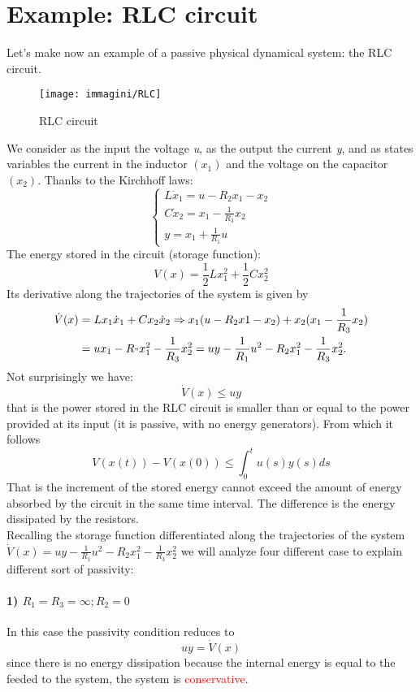 \section{Example: RLC circuit}
Let's make now an example of a passive physical dynamical system: the RLC circuit.
\begin{figure}[H]
	\centering
	\texttt{[image: immagini/RLC]}
	\caption{RLC circuit}
	\label{fig:rlc}
\end{figure}
We consider as the input the voltage \emph{u}, as the output the current \emph{y}, and as states variables the current in the inductor $(x_1)$ and the voltage on the capacitor $(x_2)$. Thanks to the Kirchhoff laws:
\[
\begin{cases}
	 L\dot{x}_1=u-R_2x_1-x_2\\
	C\dot{x}_2=x_1-\frac{1}{R_3}x_2\\
	y=x_1+\frac{1}{R_1}u
\end{cases}
\]
The energy stored in the circuit (storage function):\[V(x)=\frac{1}{2}Lx_1^2+\frac{1}{2}Cx_2^2\]
Its derivative along the trajectories of the system is given by
\[
\begin{aligned}
	\dot{V}(x)&=Lx_1\dot{x}_1+Cx_2\dot{x}_2\Rightarrow x_1(u-R_2x1-x_2)+x_2(x_1-\frac{1}{R_3}x_2) \\
	&=ux_1-R_"x_1^2-\frac{1}{R_3}x_2^2=uy-\frac{1}{R_1}u^2-R_2x_1^2-\frac{1}{R_3}x_2^2.
\end{aligned}
\]
Not surprisingly we have:
\[
\dot{V}(x)\le uy
\]
that is the power stored in the RLC circuit is smaller than or equal to the power provided at its input (it is passive, with no energy generators). From which it follows \[
V(x(t))-V(x(0))\le\int_{0}^{t}u(s)y(s)ds
\]
That is the increment of the stored energy cannot exceed the amount of energy absorbed by the circuit in the same time interval. The difference is the energy dissipated by the resistors.
\\Recalling the storage function differentiated along the trajectories of the system $\dot{V}(x)=uy-\frac{1}{R_1}u^2-R_2x_1^2-\frac{1}{R_3}x_2^2$ we will analyze four different case to explain different sort of passivity:
\paragraph{1) $R_1=R_3=\infty; R_2=0 $}
In this case the passivity condition reduces to \[uy=\dot{V}(x)\] since there is no energy dissipation because the internal energy is equal to the feeded to the system, the system is \textcolor{red}{conservative}.
